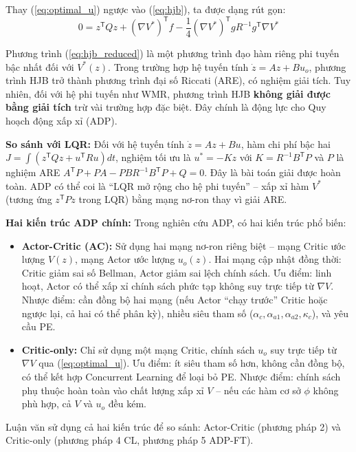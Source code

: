 \documentclass[12pt,a4paper]{article}
\newcommand{\T}{\mathsf{T}}
\begin{document}
Thay (\ref{eq:optimal_u}) ngược vào (\ref{eq:hjb}), ta được dạng rút gọn:
\begin{equation}\label{eq:hjb_reduced}
    0 = z^\T Q z + (\nabla V^*)^\T f - \frac{1}{4} (\nabla V^*)^\T g R^{-1} g^\T \nabla V^*
\end{equation}

Phương trình (\ref{eq:hjb_reduced}) là một phương trình đạo hàm riêng phi tuyến bậc nhất đối với $V^*(z)$. Trong trường hợp hệ tuyến tính $\dot{z} = Az + Bu_o$, phương trình HJB trở thành phương trình đại số Riccati (ARE), có nghiệm giải tích. Tuy nhiên, đối với hệ phi tuyến như WMR, phương trình HJB \textbf{không giải được bằng giải tích} trừ vài trường hợp đặc biệt. Đây chính là động lực cho Quy hoạch động xấp xỉ (ADP).

\textbf{So sánh với LQR:} Đối với hệ tuyến tính $\dot{z} = Az + Bu$, hàm chi phí bậc hai $J = \int(z^\T Qz + u^\T Ru)dt$, nghiệm tối ưu là $u^* = -Kz$ với $K = R^{-1}B^\T P$ và $P$ là nghiệm ARE $A^\T P + PA - PBR^{-1}B^\T P + Q = 0$. Đây là bài toán giải được hoàn toàn. ADP có thể coi là ``LQR mở rộng cho hệ phi tuyến'' -- xấp xỉ hàm $V^*$ (tương ứng $z^\T Pz$ trong LQR) bằng mạng nơ-ron thay vì giải ARE.

\textbf{Hai kiến trúc ADP chính:} Trong nghiên cứu ADP, có hai kiến trúc phổ biến:

\begin{itemize}
    \item \textbf{Actor-Critic (AC):} Sử dụng hai mạng nơ-ron riêng biệt -- mạng Critic ước lượng $V(z)$, mạng Actor ước lượng $u_o(z)$. Hai mạng cập nhật đồng thời: Critic giảm sai số Bellman, Actor giảm sai lệch chính sách. Ưu điểm: linh hoạt, Actor có thể xấp xỉ chính sách phức tạp không suy trực tiếp từ $\nabla V$. Nhược điểm: cần đồng bộ hai mạng (nếu Actor ``chạy trước'' Critic hoặc ngược lại, cả hai có thể phân kỳ), nhiều siêu tham số ($\alpha_c, \alpha_{a1}, \alpha_{a2}, \kappa_c$), và yêu cầu PE.

    \item \textbf{Critic-only:} Chỉ sử dụng một mạng Critic, chính sách $u_o$ suy trực tiếp từ $\nabla V$ qua (\ref{eq:optimal_u}). Ưu điểm: ít siêu tham số hơn, không cần đồng bộ, có thể kết hợp Concurrent Learning để loại bỏ PE. Nhược điểm: chính sách phụ thuộc hoàn toàn vào chất lượng xấp xỉ $V$ -- nếu các hàm cơ sở $\phi$ không phù hợp, cả $V$ và $u_o$ đều kém.
\end{itemize}

Luận văn sử dụng cả hai kiến trúc để so sánh: Actor-Critic (phương pháp 2) và Critic-only (phương pháp 4 CL, phương pháp 5 ADP-FT).
\end{document}
